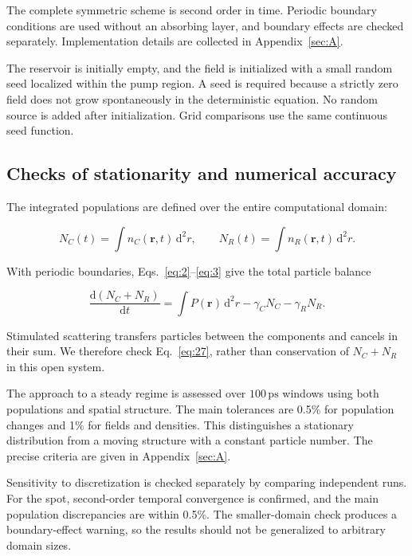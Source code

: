 \documentclass[12pt,a4paper]{article}
\begin{document}
The complete symmetric scheme is second order in time. Periodic boundary conditions are used without an absorbing layer, and boundary effects are checked separately. Implementation details are collected in Appendix~\ref{sec:A}.

The reservoir is initially empty, and the field is initialized with a small random seed localized within the pump region. A seed is required because a strictly zero field does not grow spontaneously in the deterministic equation. No random source is added after initialization. Grid comparisons use the same continuous seed function.

\subsection{Checks of stationarity and numerical accuracy}\label{sec:5.3}

The integrated populations are defined over the entire computational domain:

\begin{equation}\label{eq:26}
N_C(t)=\int n_C(\mathbf r,t)\,\mathrm d^2r,\qquad N_R(t)=\int n_R(\mathbf r,t)\,\mathrm d^2r.\end{equation}

With periodic boundaries, Eqs.~\eqref{eq:2}--\eqref{eq:3} give the total particle balance

\begin{equation}\label{eq:27}
\frac{\mathrm d(N_C+N_R)}{\mathrm dt}=\int P(\mathbf r)\,\mathrm d^2r-\gamma_CN_C-\gamma_RN_R.\end{equation}

Stimulated scattering transfers particles between the components and cancels in their sum. We therefore check Eq.~\eqref{eq:27}, rather than conservation of $N_{C}+N_{R}$ in this open system.

The approach to a steady regime is assessed over $100\,\mathrm{ps}$ windows using both populations and spatial structure. The main tolerances are 0.5\% for population changes and 1\% for fields and densities. This distinguishes a stationary distribution from a moving structure with a constant particle number. The precise criteria are given in Appendix~\ref{sec:A}.

Sensitivity to discretization is checked separately by comparing independent runs. For the spot, second-order temporal convergence is confirmed, and the main population discrepancies are within 0.5\%. The smaller-domain check produces a boundary-effect warning, so the results should not be generalized to arbitrary domain sizes.
\end{document}
